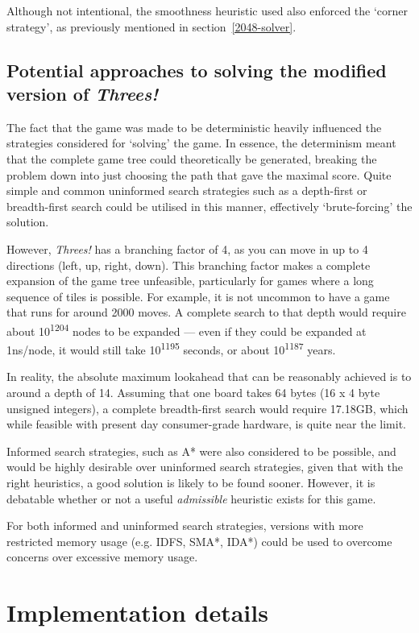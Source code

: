 \documentclass[a4paper, 11pt, titlepage]{report}
\newcommand{\ts}{\textsuperscript}
\newcommand{\threes}{\emph{Threes!}}
\begin{document}
Although not intentional, the smoothness heuristic used also enforced the `corner strategy', as previously mentioned in section~\ref{2048-solver}.

\section{Potential approaches to solving the modified version of \threes{}}
The fact that the game was made to be deterministic heavily influenced the strategies considered for `solving' the game. In essence, the determinism meant that the complete game tree could theoretically be generated, breaking the problem down into just choosing the path that gave the maximal score. Quite simple and common uninformed search strategies such as a depth-first or breadth-first search could be utilised in this manner, effectively `brute-forcing' the solution.

However, \threes{} has a branching factor of 4, as you can move in up to 4 directions (left, up, right, down). This branching factor makes a complete expansion of the game tree unfeasible, particularly for games where a long sequence of tiles is possible. For example, it is not uncommon to have a game that runs for around 2000 moves. A complete search to that depth would require about 10\ts{1204} nodes to be expanded --- even if they could be expanded at 1ns/node, it would still take 10\ts{1195} seconds, or about 10\ts{1187} years.  

In reality, the absolute maximum lookahead that can be reasonably achieved is to around a depth of 14. Assuming that one board takes 64 bytes (16 x 4 byte unsigned integers), a complete breadth-first search would require 17.18GB, which while feasible with present day consumer-grade hardware, is quite near the limit. 

Informed search strategies, such as A* were also considered to be possible, and would be highly desirable over uninformed search strategies, given that with the right heuristics, a good solution is likely to be found sooner. However, it is debatable whether or not a useful \emph{admissible} heuristic exists for this game. 

For both informed and uninformed search strategies, versions with more restricted memory usage (e.g. IDFS, SMA*, IDA*) could be used to overcome concerns over excessive memory usage.

\chapter{Implementation details}
\end{document}
